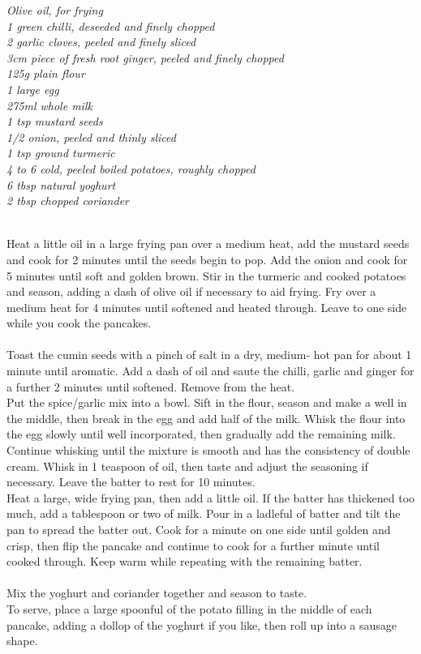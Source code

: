 \documentclass{tufte-book}
\begin{document}
\smallskip
\emph{Olive oil, for frying
\\1 green chilli, deseeded and finely chopped
\\2 garlic cloves, peeled and finely sliced
\\3cm piece of fresh root ginger, peeled and finely chopped
\\125g plain flour
\\1 large egg
\\275ml whole milk
\\1 tsp mustard seeds
\\1/2 onion, peeled and thinly sliced
\\1 tsp ground turmeric
\\4 to 6 cold, peeled boiled potatoes, roughly chopped
\\6 tbsp natural yoghurt
\\2 tbsp chopped coriander}

\smallskip
{} 
\\Heat a little oil in a large frying pan over a medium heat, add the mustard seeds and cook for 2 minutes until the seeds begin to pop. Add the onion and cook for 5 minutes until soft and golden brown. Stir in the turmeric and cooked potatoes and season, adding a dash of olive oil if necessary to aid frying. Fry over a medium heat for 4 minutes until softened and heated through. Leave to one side while you cook the pancakes.
\\ 
\\Toast the cumin seeds with a pinch of salt in a dry, medium- hot pan for about 1 minute until aromatic. Add a dash of oil and saute the chilli, garlic and ginger for a further 2 minutes until softened. Remove from the heat.
\\Put the spice/garlic mix into a bowl. Sift in the flour, season and make a well in the middle, then break in the egg and add half of the milk. Whisk the flour into the egg slowly until well incorporated, then gradually add the remaining milk. Continue whisking until the mixture is smooth and has the consistency of double cream. Whisk in 1 teaspoon of oil, then taste and adjust the seasoning if necessary. Leave the batter to rest for 10 minutes.
\\Heat a large, wide frying pan, then add a little oil. If the batter has thickened too much, add a tablespoon or two of milk. Pour in a ladleful of batter and tilt the pan to spread the batter out. Cook for a minute on one side until golden and crisp, then flip the pancake and continue to cook for a further minute until cooked through. Keep warm while repeating with the remaining batter.
\\ 
\\Mix the yoghurt and coriander together and season to taste.
\\To serve, place a large spoonful of the potato filling in the middle of each pancake, adding a dollop of the yoghurt if you like, then roll up into a sausage shape.
\end{document}
